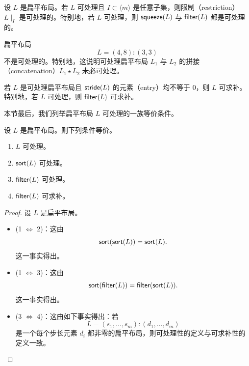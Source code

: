 \begin{example}
    设 $L$ 是扁平布局。若 $L$ 可处理且 $I \subset \langle m \rangle$ 是任意子集，则限制（restriction）$L \mid_I$ 是可处理的。特别地，若 $L$ 可处理，则 $\mathsf{squeeze}(L)$ 与 $\mathsf{filter}(L)$ 都是可处理的。
\end{example}

\begin{example}
    扁平布局
    \[L = (4,8):(3,3)\]
    不是可处理的。特别地，这说明可处理扁平布局 $L_1$ 与 $L_2$ 的拼接（concatenation）$L_1 \star L_2$ 未必可处理。
\end{example}


\begin{observation}
    若 $L$ 是可处理扁平布局且 $\mathsf{stride}(L)$ 的元素（entry）均不等于 $0$，则 $L$ 可求补。特别地，若 $L$ 可处理，则 $\mathsf{filter}(L)$ 可求补。
\end{observation}

本节最后，我们列举扁平布局 $L$ 可处理的一族等价条件。

\begin{proposition}\label{equivalentconditionsfortractable}
    设 $L$ 是扁平布局。则下列条件等价。
    \begin{enumerate}
        \item $L$ 可处理。
        \item $\mathsf{sort}(L)$ 可处理。
        \item $\mathsf{filter}(L)$ 可处理。
        \item $\mathsf{filter}(L)$ 可求补。
    \end{enumerate}
\end{proposition}

\begin{proof} 设 $L$ 是扁平布局。
    \begin{itemize}
        \item (1 $\Leftrightarrow $ 2)：这由
        \[
        \mathsf{sort}(\mathsf{sort}(L)) = \mathsf{sort}(L).
        \]
        这一事实得出。
        \item (1 $\Leftrightarrow $ 3)：这由
        \[
        \mathsf{sort}(\mathsf{filter}(L)) = \mathsf{filter}(\mathsf{sort}(L)).
        \]
        这一事实得出。
        \item (3 $\Leftrightarrow $ 4)：这由如下事实得出：若
        \[
        L = (s_1,\dots,s_m):(d_1,\dots,d_m)
        \]
        是一个每个步长元素 $d_i$ 都非零的扁平布局，则可处理性的定义与可求补性的定义一致。
    \end{itemize}
\end{proof}


\newpage


